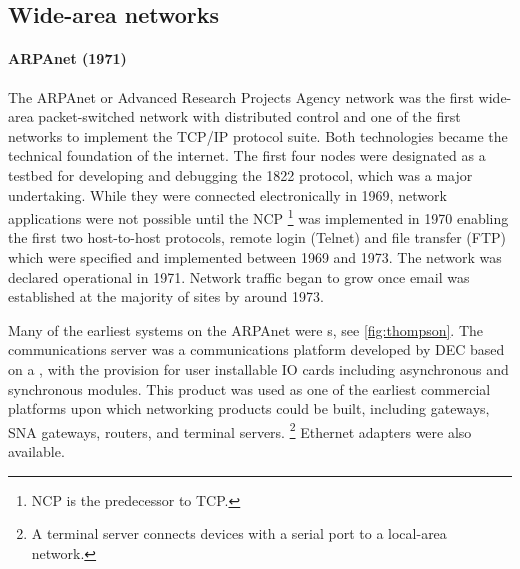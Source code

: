 \subsection{Wide-area networks}
\label{sec:network-evoluation-wan}

\paragraph{ARPAnet (1971)}%
The ARPAnet or Advanced Research Projects Agency network was the first wide-area packet-switched network with distributed control and one of the first networks to implement the \acs{TCP}/\acs{IP} protocol suite.
Both technologies became the technical foundation of the internet.
The first four nodes were designated as a testbed for developing and debugging the 1822 protocol, which was a major undertaking.
While they were connected electronically in 1969, network applications were not possible until the \gls{NCP}%
   \footnote{\acs{NCP} is the predecessor to \acs{TCP}.}
was implemented in 1970 enabling the first two host-to-host protocols, remote login (Telnet) and file transfer (\acs{FTP}) which were specified and implemented between 1969 and 1973.
The network was declared operational in 1971.
Network traffic began to grow once email was established at the majority of sites by around 1973.

Many of the earliest systems on the ARPAnet were s, see \vref{fig:thompson}.
The  communications server was a communications platform developed by \gls{DEC} based on a , with the provision for user installable \gls{IO} cards including asynchronous and synchronous modules.
This product was used as one of the earliest commercial platforms upon which networking products could be built, including  gateways, \gls{SNA} gateways, routers, and terminal servers.%
\footnote{A terminal server connects devices with a serial port to a local-area network.}
Ethernet adapters were also available.

